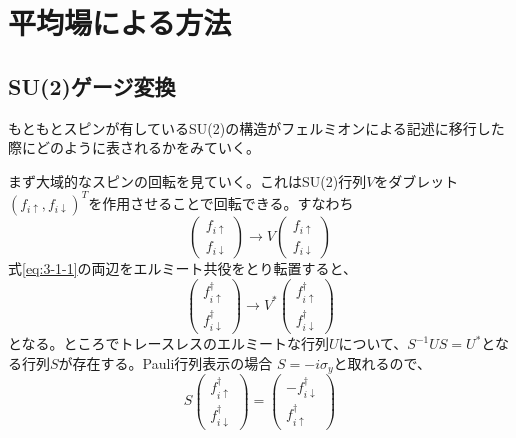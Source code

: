 \documentclass[11pt, aps, longbibliography]{article}
\begin{document}
\section{平均場による方法}
    \subsection{SU(2)ゲージ変換}
        もともとスピンが有しているSU(2)の構造がフェルミオンによる記述に移行した際にどのように表されるかをみていく。
        
        まず大域的なスピンの回転を見ていく。これはSU(2)行列$V$をダブレット$(f_{i\uparrow}, f_{i\downarrow})^T$を作用させることで回転できる。すなわち
        \begin{equation}\label{eq:3-1-1}
            \begin{pmatrix}
                f_{i\uparrow} \\ f_{i\downarrow}
            \end{pmatrix} \rightarrow V \begin{pmatrix}
                f_{i\uparrow} \\ f_{i\downarrow}
            \end{pmatrix}
        \end{equation}
        式\eqref{eq:3-1-1}の両辺をエルミート共役をとり転置すると、
        \begin{equation}\label{eq:3-1-2}
            \begin{pmatrix}
                f_{i\uparrow}^\dagger \\ f_{i\downarrow}^\dagger
            \end{pmatrix} \rightarrow V^* \begin{pmatrix}
                f_{i\uparrow}^\dagger \\ f_{i\downarrow}^\dagger
            \end{pmatrix}
        \end{equation}
        となる。ところでトレースレスのエルミートな行列$U$について、$S^{-1}US=U^*$となる行列$S$が存在する。Pauli行列表示の場合
        $S=-i\sigma_y$と取れるので、
        \begin{equation}\label{eq:3-1-3}
            S\begin{pmatrix}
                f_{i\uparrow}^\dagger \\ f_{i\downarrow}^\dagger
            \end{pmatrix} =  \begin{pmatrix}
                -f_{i\downarrow}^\dagger \\ f_{i\uparrow}^\dagger
            \end{pmatrix}
        \end{equation}
\end{document}
